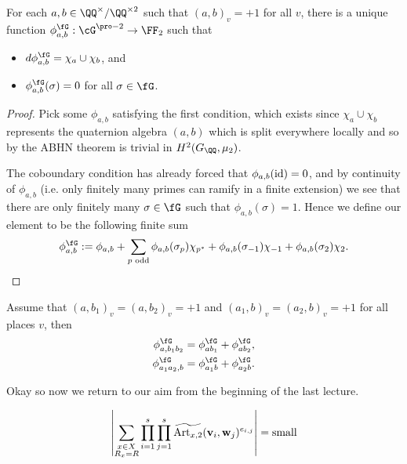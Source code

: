 \documentclass{lecturenotes}
\newcommand{\Art}{\operatorname{Art}}
\newcommand{\bv}{\mathbf{v}}
\newcommand{\bw}{\mathbf{w}}
\numberwithin{equation}{section}
\begin{document}
\begin{corollary}
    For each $a,b\in \QQ^\times/\QQ^{\times 2}$ such that $(a,b)_v=+1$ for all $v$, there is a unique function $\phi_{a,b}^{\fG}:\cG^{\pro-2}\to \FF_2$ such that 
    \begin{itemize}
        \item $d\phi_{a,b}^{\fG}=\chi_a\cup \chi_b$, and
        \item $\phi_{a,b}^{\fG}(\sigma)=0$ for all $\sigma\in \fG$. 
    \end{itemize}
\end{corollary}
\begin{proof}
    Pick some $\phi_{a,b}$ satisfying the first condition, which exists since $\chi_a\cup\chi_b$ represents the quaternion algebra $(a,b)$ which is split everywhere locally and so by the ABHN theorem is trivial in $H^2(G_\QQ,\mu_2)$.

    The coboundary condition has already forced that $\phi_{a,b}(\textnormal{id})=0$, and by continuity of $\phi_{a,b}$ (i.e. only finitely many primes can ramify in a finite extension) we see that there are only finitely many $\sigma\in\fG$ such that $\phi_{a,b}(\sigma)=1$.  Hence we define our element to be the following finite sum
    \[\phi_{a,b}^\fG:=\phi_{a,b}+\sum_{p\textnormal{ odd}}\phi_{a,b}(\sigma_p)\chi_{p^*}+\phi_{a,b}(\sigma_{-1})\chi_{-1}+\phi_{a,b}(\sigma_{2})\chi_{2}.\]
\end{proof}
\begin{corollary}\label{cor:additivity}
Assume that $(a,b_1)_v=(a,b_2)_v=+1$ and $(a_1,b)_v=(a_2,b)_v=+1$ for all places $v$, then 
    \begin{align*}
    \phi_{a,b_1b_2}^{\fG}&=\phi_{ab_1}^\fG+\phi_{ab_2}^{\fG},\\
    \phi_{a_1a_2,b}^{\fG}&=\phi_{a_1b}^\fG+\phi_{a_2b}^{\fG}.
    \end{align*}
\end{corollary}

Okay so now we return to our aim from the beginning of the last lecture.
\begin{theorem}
\[\abs{\sum_{\substack{x\in X\\R_x=R}}\prod_{i=1}^s\prod_{j=1}^s\widetilde{\Art_{x,2}}(\bv_i,\bw_j)^{e_{i,j}}}=\textnormal{small}\]
\end{theorem}
\end{document}
